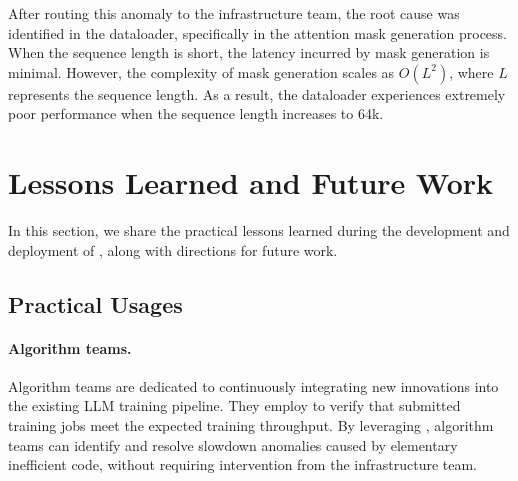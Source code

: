 After routing this anomaly to the infrastructure team, the root cause was identified in the dataloader, specifically in the attention mask generation process. When the sequence length is short, the latency incurred by mask generation is minimal. However, the complexity of mask generation scales as $O(L^2)$, where $L$ represents the sequence length. As a result, the dataloader experiences extremely poor performance when the sequence length increases to 64k.





\section{Lessons Learned and Future Work}
\label{sec:practical}
In this section, we share the practical lessons learned during the development and deployment of \sysname{}, along with directions for future work.

\subsection{Practical Usages}
\paragraph{Algorithm teams.}
Algorithm teams are dedicated to continuously integrating new innovations into the existing LLM training pipeline. They employ \sysname{} to verify that submitted training jobs meet the expected training throughput. By leveraging \sysname{}, algorithm teams can identify and resolve slowdown anomalies caused by elementary inefficient code, without requiring intervention from the infrastructure team.
